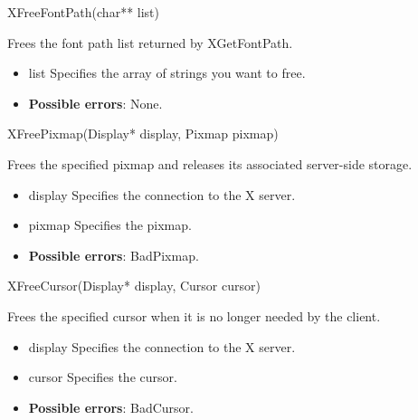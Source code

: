 \documentclass{report}
\begin{document}
\begin{itemize}
            \begin{cppcode}
                XFreeFontPath(char** list)
            \end{cppcode}
            \bigbreak \noindent 
            Frees the font path list returned by XGetFontPath.
            \begin{itemize}
                \item list Specifies the array of strings you want to free.
            \end{itemize}
            \begin{itemize}
                \item \textbf{Possible errors}: None.
            \end{itemize}

            \begin{cppcode}
                XFreePixmap(Display* display, Pixmap pixmap)
            \end{cppcode}
            \bigbreak \noindent 
            Frees the specified pixmap and releases its associated server-side storage.
            \begin{itemize}
                \item display Specifies the connection to the X server.
                \item pixmap Specifies the pixmap.
            \end{itemize}
            \begin{itemize}
                \item \textbf{Possible errors}: BadPixmap.
            \end{itemize}

            \begin{cppcode}
                XFreeCursor(Display* display, Cursor cursor)
            \end{cppcode}
            \bigbreak \noindent 
            Frees the specified cursor when it is no longer needed by the client.
            \begin{itemize}
                \item display Specifies the connection to the X server.
                \item cursor Specifies the cursor.
            \end{itemize}
            \begin{itemize}
                \item \textbf{Possible errors}: BadCursor.
            \end{itemize}




    \end{itemize}
\end{document}
